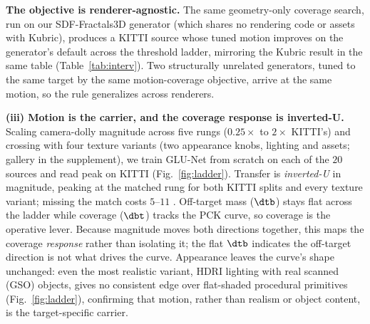 \noindent\textbf{The objective is renderer-agnostic.}
The same geometry-only coverage search, run on our SDF-Fractals3D generator (which
shares no rendering code or assets with Kubric), produces a KITTI source whose
tuned motion improves on the generator's default across the \pck{} threshold ladder,
mirroring the Kubric result in the same table
(Table~\ref{tab:interv}). Two structurally unrelated generators, tuned to
the same target by the same motion-coverage objective, arrive at the same motion, so
the rule generalizes across renderers.

\noindent\textbf{(iii) Motion is the carrier, and the coverage response is
inverted-U.} Scaling camera-dolly magnitude across five rungs ($0.25\times$ to
$2\times$ KITTI's) and crossing with four texture variants (two appearance
knobs, lighting and assets; gallery in the supplement), we train GLU-Net from
scratch on each of the $20$ sources and read peak \pck{} on KITTI
(Fig.~\ref{fig:ladder}). Transfer is \emph{inverted-U} in magnitude, peaking at
the matched rung for both KITTI splits and every texture variant; missing the
match costs $5$--$11$ \pck. Off-target mass ($\dtb$) stays flat across the ladder
while coverage ($\dbt$) tracks the PCK curve, so coverage is the operative
lever. Because magnitude moves both directions together, this maps the coverage
\emph{response} rather than isolating it; the flat $\dtb$ indicates the off-target
direction is not what drives the curve. Appearance leaves the curve's shape
unchanged: even the most realistic variant, HDRI lighting with real scanned (GSO)
objects, gives no consistent edge over flat-shaded procedural primitives
(Fig.~\ref{fig:ladder}), confirming that motion, rather than realism or object
content, is the target-specific carrier.

